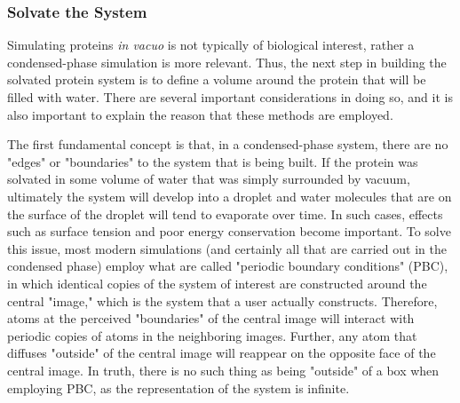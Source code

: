 \documentclass[9pt,tutorial,pubversion]{livecoms}
\begin{document}
\subsubsection{Solvate the System} \label{lyso_solv}

Simulating proteins {\em in vacuo} is not typically of biological interest, rather a condensed-phase simulation is more relevant. Thus, the next step in building the solvated protein system is to define a volume around the protein that will be filled with water. There are several important considerations in doing so, and it is also important to explain the reason that these methods are employed.

The first fundamental concept is that, in a condensed-phase system, there are no "edges" or "boundaries" to the system that is being built. If the protein was solvated in some volume of water that was simply surrounded by vacuum, ultimately the system will develop into a droplet and water molecules that are on the surface of the droplet will tend to evaporate over time. In such cases, effects such as surface tension and poor energy conservation become important. To solve this issue, most modern simulations (and certainly all that are carried out in the condensed phase) employ what are called "periodic boundary conditions" (PBC), in which identical copies of the system of interest are constructed around the central "image," which is the system that a user actually constructs. Therefore, atoms at the perceived "boundaries" of the central image will interact with periodic copies of atoms in the neighboring images. Further, any atom that diffuses "outside" of the central image will reappear on the opposite face of the central image. In truth, there is no such thing as being "outside" of a box when employing PBC, as the representation of the system is infinite.
\end{document}

